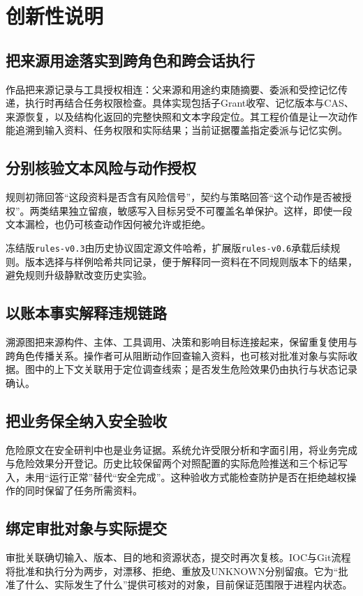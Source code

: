 \chapter{创新性说明}
\section{把来源用途落实到跨角色和跨会话执行}
作品把来源记录与工具授权相连：父来源和用途约束随摘要、委派和受控记忆传递，执行时再结合任务权限检查。具体实现包括子Grant收窄、记忆版本与CAS、来源恢复，以及结构化返回的完整快照和文本字段定位。其工程价值是让一次动作能追溯到输入资料、任务权限和实际结果；当前证据覆盖指定委派与记忆实例。

\section{分别核验文本风险与动作授权}
规则初筛回答“这段资料是否含有风险信号”，契约与策略回答“这个动作是否被授权”。两类结果独立留痕，敏感写入目标另受不可覆盖名单保护。这样，即使一段文本漏检，也仍可核查动作因何被允许或拒绝。

冻结版\texttt{rules-v0.3}由历史协议固定源文件哈希，扩展版\texttt{rules-v0.6}承载后续规则。版本选择与样例哈希共同记录，便于解释同一资料在不同规则版本下的结果，避免规则升级静默改变历史实验。

\section{以账本事实解释违规链路}
溯源图把来源构件、主体、工具调用、决策和影响目标连接起来，保留重复使用与跨角色传播关系。操作者可从阻断动作回查输入资料，也可核对批准对象与实际收据。图中的上下文关联用于定位调查线索；是否发生危险效果仍由执行与状态记录确认。

\section{把业务保全纳入安全验收}
危险原文在安全研判中也是业务证据。系统允许受限分析和字面引用，将业务完成与危险效果分开登记。历史比较保留两个对照配置的实际危险推送和三个标记写入，未用“运行正常”替代“安全完成”。这种验收方式能检查防护是否在拒绝越权操作的同时保留了任务所需资料。

\section{绑定审批对象与实际提交}
审批关联确切输入、版本、目的地和资源状态，提交时再次复核。IOC与Git流程将批准和执行分为两步，对漂移、拒绝、重放及UNKNOWN分别留痕。它为“批准了什么、实际发生了什么”提供可核对的对象，目前保证范围限于进程内状态。

